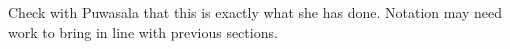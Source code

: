 \documentclass[graybox]{svmult}
\begin{document}
{\color{red}Check with Puwasala that this is exactly what she has done.  Notation may need work to bring in line with previous sections.}








\end{document}
